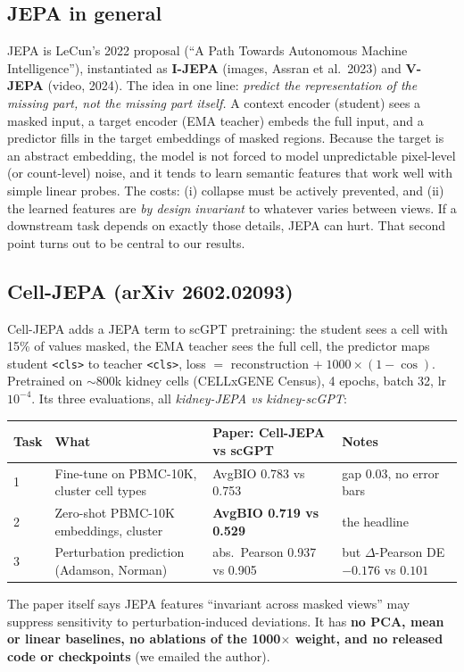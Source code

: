 \documentclass[11pt]{article}
\newcommand{\code}[1]{\texttt{\small #1}}
\begin{document}
\subsection{JEPA in general}
JEPA is LeCun's 2022 proposal (``A Path Towards Autonomous Machine Intelligence''), instantiated as \textbf{I-JEPA} (images, Assran et al.\ 2023) and \textbf{V-JEPA} (video, 2024). The idea in one line: \emph{predict the representation of the missing part, not the missing part itself.} A context encoder (student) sees a masked input, a target encoder (EMA teacher) embeds the full input, and a predictor fills in the target embeddings of masked regions. Because the target is an abstract embedding, the model is not forced to model unpredictable pixel-level (or count-level) noise, and it tends to learn semantic features that work well with simple linear probes. The costs: (i) collapse must be actively prevented, and (ii) the learned features are \emph{by design invariant} to whatever varies between views. If a downstream task depends on exactly those details, JEPA can hurt. That second point turns out to be central to our results.

\subsection{Cell-JEPA (arXiv 2602.02093)}
Cell-JEPA adds a JEPA term to scGPT pretraining: the student sees a cell with 15\% of values masked, the EMA teacher sees the full cell, the predictor maps student \code{<cls>} to teacher \code{<cls>}, loss $=$ reconstruction $+\;1000\times(1-\cos)$. Pretrained on $\sim$800k kidney cells (CELLxGENE Census), 4 epochs, batch 32, lr $10^{-4}$. Its three evaluations, all \emph{kidney-JEPA vs kidney-scGPT}:
\begin{center}\small
\begin{tabular}{llll}
\toprule
Task & What & Paper: Cell-JEPA vs scGPT & Notes\\
\midrule
1 & Fine-tune on PBMC-10K, cluster cell types & AvgBIO 0.783 vs 0.753 & gap 0.03, no error bars\\
2 & Zero-shot PBMC-10K embeddings, cluster & \textbf{AvgBIO 0.719 vs 0.529} & the headline\\
3 & Perturbation prediction (Adamson, Norman) & abs.\ Pearson 0.937 vs 0.905 & but $\Delta$-Pearson DE $-0.176$ vs $0.101$\\
\bottomrule
\end{tabular}
\end{center}
The paper itself says JEPA features ``invariant across masked views'' may suppress sensitivity to perturbation-induced deviations. It has \textbf{no PCA, mean or linear baselines, no ablations of the 1000$\times$ weight, and no released code or checkpoints} (we emailed the author).
\end{document}
